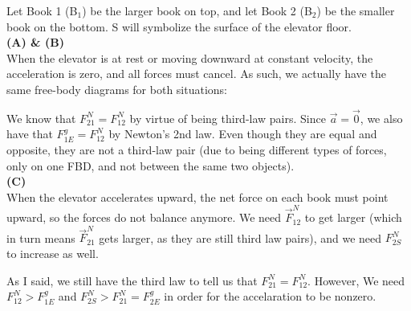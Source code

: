 \documentclass[]{article}
\begin{document}
\begin{TeacherMargin}
\noindent Let Book 1 (B$_{1}$) be the larger book on top, and let Book 2 (B$_{2}$) be the smaller book on the bottom. S will symbolize the surface of the elevator floor. \\
\textbf{(A) \& (B)} \\
When the elevator is at rest or moving downward at constant velocity, the acceleration is zero, and all forces must cancel. As such, we actually have the same free-body diagrams for both situations:
\begin{center}
\end{center}
We know that $F^{N}_{21} = F^{N}_{12}$ by virtue of being third-law pairs. Since $\vec{a}=\vec{0}$, we also have that $F^{g}_{1E} = F^{N}_{12}$ by Newton's 2nd law. Even though they are equal and opposite, they are not a third-law pair (due to being different types of forces, only on one FBD, and not between the same two objects). \\
\textbf{(C)} \\
When the elevator accelerates upward, the net force on each book must point upward, so the forces do not balance anymore. We need $\vec{F}^{N}_{12}$ to get larger (which in turn means $\vec{F}^{N}_{21}$ gets larger, as they are still third law pairs), and we need $F^{N}_{2S}$ to increase as well.
\begin{center}
\end{center}
As I said, we still have the third law to tell us that $F^{N}_{21} = F^{N}_{12}$. However, We need $F^{N}_{12} > F^{g}_{1E}$ and $F^{N}_{2S}>F^{N}_{21}=F^{g}_{2E}$ in order for the accelaration to be nonzero.
\end{TeacherMargin}
\end{document}
